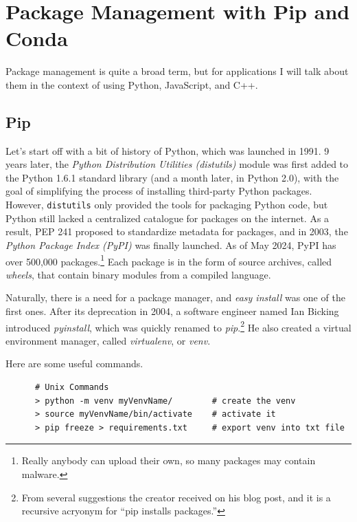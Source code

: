 \section{Package Management with Pip and Conda} 

  Package management is quite a broad term, but for applications I will talk about them in the context of using Python, JavaScript, and C++. 

\subsection{Pip} 

  Let's start off with a bit of history of Python, which was launched in 1991. 9 years later, the \textit{Python Distribution Utilities (distutils)} module was first added to the Python 1.6.1 standard library (and a month later, in Python 2.0), with the goal of simplifying the process of installing third-party Python packages. However, \texttt{distutils} only provided the tools for packaging Python code, but Python still lacked a centralized catalogue for packages on the internet. As a result, PEP 241 proposed to standardize metadata for packages, and in 2003, the \textit{Python Package Index (PyPI)} was finally launched. As of May 2024, PyPI has over 500,000 packages.\footnote{Really anybody can upload their own, so many packages may contain malware.} Each package is in the form of source archives, called \textit{wheels}, that contain binary modules from a compiled language. 

  Naturally, there is a need for a package manager, and \textit{easy install} was one of the first ones. After its deprecation in 2004, a software engineer named Ian Bicking introduced \textit{pyinstall}, which was quickly renamed to \textit{pip}.\footnote{From several suggestions the creator received on his blog post, and it is a recursive acryonym for ``pip installs packages.''} He also created a virtual environment manager, called \textit{virtualenv}, or \textit{venv}. 

  \begin{example}
    \label{ex:managing-virtualenvs}
    Here are some useful commands. 
    \begin{lstlisting}
      # Unix Commands
      > python -m venv myVenvName/        # create the venv
      > source myVenvName/bin/activate    # activate it  
      > pip freeze > requirements.txt     # export venv into txt file 
    \end{lstlisting}
  \end{example}

